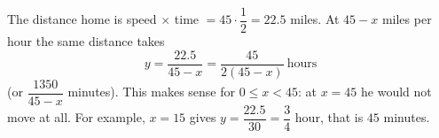 The distance home is speed $\times$ time $=45\cdot\dfrac{1}{2}=22.5$ miles. At $45-x$ miles per hour the same distance takes
\[
\boxed{y=\dfrac{22.5}{45-x}=\dfrac{45}{2(45-x)}}\ \text{hours}
\]
(or $\dfrac{1350}{45-x}$ minutes). This makes sense for $0\le x<45$: at $x=45$ he would not move at all. For example, $x=15$ gives $y=\dfrac{22.5}{30}=\dfrac{3}{4}$ hour, that is $45$ minutes.
